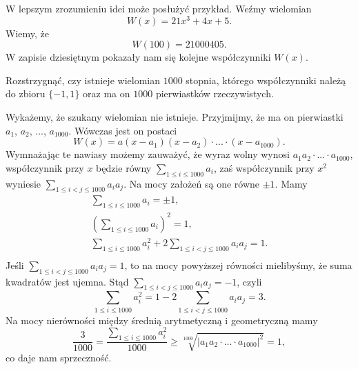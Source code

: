 \begin{remark}
    W lepszym zrozumieniu idei może posłużyć przykład. Weźmy wielomian
    \[
        W(x) = 21x^3 + 4x + 5.
    \]
    Wiemy, że
    \[
        W(100) = 21000405.
    \]
    W zapisie dziesiętnym pokazały nam się kolejne współczynniki $W(x)$.
\end{remark}

\begin{problem}{7}
    Rozstrzygnąć, czy istnieje wielomian $1000$ stopnia, którego współczynniki należą do zbioru $\{-1, 1\}$ oraz ma on $1000$ pierwiastków rzeczywistych.
\end{problem}

\noindent
Wykażemy, że szukany wielomian nie istnieje. Przyjmijmy, że ma on pierwiastki $a_1$, $a_2$, ..., $a_{1000}$. Wówczas jest on postaci
\[
    W(x) = a(x - a_1)(x - a_2)\cdot ... \cdot (x - a_{1000}).
\]
Wymnażając te nawiasy możemy zauważyć, że wyraz wolny wynosi $a_1a_2 \cdot ... \cdot a_{1000}$, współczynnik przy $x$ będzie równy $\sum_{1 \leqslant i \leqslant 1000} a_i$, zaś współczynnik przy $x^2$ wyniesie $\sum_{1 \leqslant i < j \leqslant 1000} a_ia_j$. Na mocy założeń są one równe $\pm 1$. Mamy
\begin{align*}
    \sum_{1 \leqslant i \leqslant 1000} a_i = \pm 1, \\
    \left(\sum_{1 \leqslant i \leqslant 1000} a_i\right)^2 = 1, \\
   \sum_{1 \leqslant i \leqslant 1000} a_i^2 + 2\sum_{1 \leqslant i < j \leqslant 1000} a_ia_j = 1. \\
\end{align*}
Jeśli $\sum_{1 \leqslant i < j \leqslant 1000} a_ia_j = 1$, to na mocy powyższej równości mielibyśmy, że suma kwadratów jest ujemna. Stąd $\sum_{1 \leqslant i < j \leqslant 1000} a_ia_j = -1$, czyli
\[
    \sum_{1 \leqslant i \leqslant 1000} a_i^2 = 1 - 2\sum_{1 \leqslant i < j \leqslant 1000} a_ia_j = 3.
\]
Na mocy nierówności między średnią arytmetyczną i geometryczną mamy
\[
   \frac{3}{1000} =  \frac{\sum_{1 \leqslant i \leqslant 1000} a_i^2}{1000} \geqslant \sqrt[1000]{|a_1a_2\cdot ... \cdot a_{1000}|^2} = 1,
\]
co daje nam sprzeczność.

